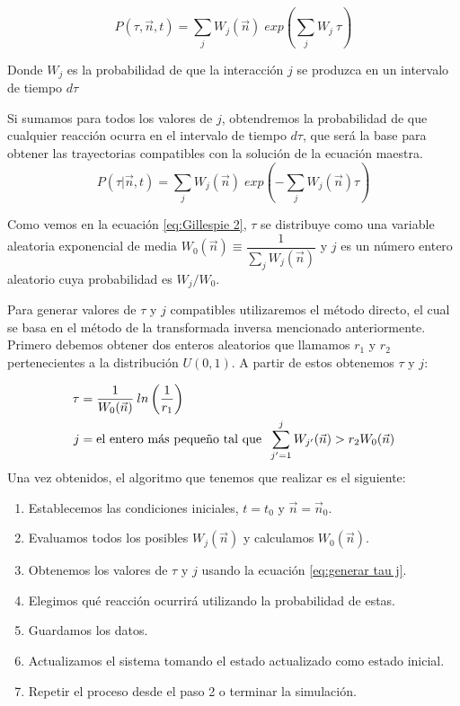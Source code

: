 \begin{equation}
    P(\tau,\vec{n},t)=\sum_j W_j(\vec{n})\; exp \left( \sum_j W_j\: \tau \right)
\end{equation}

Donde $W_j$ es la probabilidad de que la interacción $j$ se produzca en un intervalo de tiempo $d \tau$

Si sumamos para todos los valores de $j$, obtendremos la probabilidad de que cualquier reacción ocurra en el intervalo de tiempo $d\tau$, que será
la base para obtener las trayectorias compatibles con la solución de la ecuación maestra.
\begin{equation}
    P(\tau|\vec{n},t)=\sum_j W_j(\vec{n})\; exp\left( -\sum_j W_j(\vec{n})\tau\right)
    \label{eq:Gillespie 2}
\end{equation}

Como vemos en la ecuación \ref{eq:Gillespie 2}, $\tau$ se distribuye como una variable aleatoria exponencial de media $W_0(\vec{n}) \equiv \dfrac{1}{ \sum_j W_j (\vec{n})}$
y $j$ es un número entero aleatorio cuya probabilidad es $W_j/W_0$.

Para generar valores de $\tau$ y $j$ compatibles utilizaremos el método directo, el cual se basa en el método de la transformada inversa
mencionado anteriormente. Primero debemos obtener dos enteros aleatorios que llamamos $r_1$ y $r_2$ pertenecientes a la distribución $U(0,1)$. A 
partir de estos obtenemos $\tau$ y $j$:

\begin{equation}
    \begin{split}
        \tau &=\dfrac{1}{W_0(\vec{n})}\:ln \left( \dfrac{1}{r_1} \right)\\
        j&=\textup{el entero más pequeño tal que} \; \; \sum_{j^{\prime}=1}^{j}W_{j^\prime}(\vec{n}) > r_2 W_0(\vec{n}) 
    \end{split}
    \label{eq:generar tau j}
\end{equation}
Una vez obtenidos, el algoritmo que tenemos que realizar es el siguiente:
\begin{enumerate}
    \item Establecemos las condiciones iniciales, $t=t_0$ y $\vec{n}=\vec{n}_0$.
    \item Evaluamos todos los posibles $W_j(\vec{n})$ y calculamos $W_0(\vec{n})$.
    \item Obtenemos los valores de $\tau$ y $j$ usando la ecuación \ref{eq:generar tau j}.
    \item Elegimos qué reacción ocurrirá utilizando la probabilidad de estas.
    \item Guardamos los datos.
    \item Actualizamos el sistema tomando el estado actualizado como estado inicial.
    \item Repetir el proceso desde el paso 2 o terminar la simulación.
\end{enumerate}
\newpage
